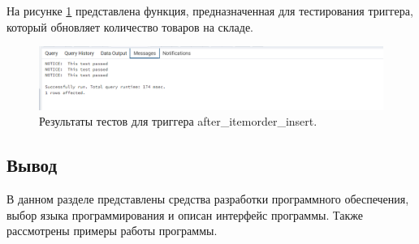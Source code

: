 На рисунке \ref{img:test} представлена функция, предназначенная для тестирования триггера, который обновляет количество товаров на складе.
\begin{figure}[ht!]
	\centering
	\includegraphics[width=0.8\linewidth]{img/test.png}
	\caption{Результаты тестов для триггера after\_itemorder\_insert.}
	\label{img:test}
\end{figure}

\subsection*{Вывод}
В данном разделе представлены средства разработки программного обеспечения, выбор языка программирования и описан интерфейс программы. Также рассмотрены примеры работы программы.